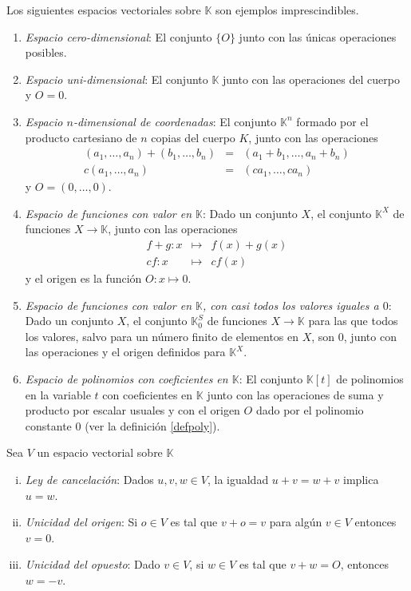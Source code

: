 \begin{ejem}\label{ejem0}
Los siguientes espacios vectoriales sobre $\mathbb{K}$ son ejemplos imprescindibles.
\begin{enumerate}
\item \emph{Espacio cero-dimensional}: El conjunto $\{O\}$ junto con las \'unicas operaciones posibles.
\item \emph{Espacio uni-dimensional}: El conjunto $\mathbb{K}$ junto con las operaciones del cuerpo y $O=0$.
\item \emph{Espacio $n$-dimensional de coordenadas}: El conjunto $\mathbb{K}^n$ formado por el producto cartesiano de $n$ copias del cuerpo $K$, junto con las operaciones
\begin{eqnarray*}
(a_1,\ldots,a_n)+(b_1,\ldots,b_n) & = & (a_1+b_1,\ldots,a_n+b_n)\\
c(a_1,\ldots,a_n) & = & (ca_1,\ldots,ca_n)
\end{eqnarray*}
y $O=(0,\ldots,0)$.
\item \emph{Espacio de funciones con valor en $\mathbb{K}$}: Dado un conjunto $X$, el conjunto $\mathbb{K}^X$ de funciones $X\rightarrow \mathbb{K}$, junto con las operaciones
\begin{eqnarray*}
  f+g: x & \mapsto & f(x)+g(x)\\
  cf: x & \mapsto & cf(x)
\end{eqnarray*}
y el origen es la función $O: x\mapsto 0$.
\item \emph{Espacio de funciones con valor en $\mathbb{K}$, con casi todos los valores iguales a $0$}: Dado un conjunto $X$, el conjunto $\mathbb{K}^S_0$ de funciones $X\rightarrow \mathbb{K}$ para las que todos los valores, salvo para un n\'umero finito de elementos en $X$, son $0$, junto con las operaciones y el origen definidos para $\mathbb{K}^X$.
\item \emph{Espacio de polinomios con coeficientes en $\mathbb{K}$}: El conjunto $\mathbb{K}[t]$ de polinomios en la variable $t$ con coeficientes en $\mathbb{K}$ junto con las operaciones de suma y producto por escalar usuales y con el origen $O$ dado por el polinomio constante $0$ (ver la definición \ref{defpoly}).
\end{enumerate} 
\end{ejem}

\begin{pro}
Sea $V$ un espacio vectorial sobre $\mathbb{K}$
\begin{enumerate}[(i)]
  \item \emph{Ley de cancelaci\'on}: Dados $u,v,w\in V$, la igualdad $u+v=w+v$ implica $u=w$.
  \item \emph{Unicidad del origen}: Si $o\in V$ es tal que $v+o=v$ para algún $v\in V$ entonces $v=0$.
  \item \emph{Unicidad del opuesto}: Dado $v\in V$, si $w\in V$ es tal que $v+w=O$, entonces $w=-v$. 
\end{enumerate}
\end{pro}

